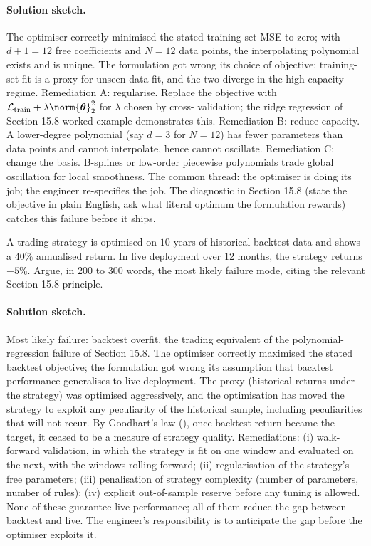 \paragraph{Solution sketch.}
The optimiser correctly minimised the stated training-set MSE to
zero; with $d + 1 = 12$ free coefficients and $N = 12$ data
points, the interpolating polynomial exists and is unique. The
formulation got wrong its choice of objective: training-set fit is
a proxy for unseen-data fit, and the two diverge in the
high-capacity regime. Remediation A: regularise. Replace the
objective with $\mathcal{L}_{\text{train}} + \lambda
\norm{\boldsymbol{\theta}}_{2}^{2}$ for $\lambda$ chosen by cross-
validation; the ridge regression of Section 15.8 worked example
demonstrates this. Remediation B: reduce capacity. A lower-degree
polynomial (say $d = 3$ for $N = 12$) has fewer parameters than
data points and cannot interpolate, hence cannot oscillate.
Remediation C: change the basis. B-splines or low-order piecewise
polynomials trade global oscillation for local smoothness. The
common thread: the optimiser is doing its job; the engineer
re-specifies the job. The diagnostic in Section 15.8 (state the
objective in plain English, ask what literal optimum the
formulation rewards) catches this failure before it ships.

\begin{exercise}
A trading strategy is optimised on $10$ years of historical
backtest data and shows a $40\%$ annualised return. In live
deployment over 12 months, the strategy returns $-5\%$. Argue,
in 200 to 300 words, the most likely failure mode, citing the
relevant Section 15.8 principle.
\end{exercise}

\paragraph{Solution sketch.}
Most likely failure: backtest overfit, the trading equivalent of
the polynomial-regression failure of Section 15.8. The optimiser
correctly maximised the stated backtest objective; the
formulation got wrong its assumption that backtest performance
generalises to live deployment. The proxy (historical returns
under the strategy) was optimised aggressively, and the
optimisation has moved the strategy to exploit any peculiarity of
the historical sample, including peculiarities that will not
recur. By Goodhart's law (\textcite{text:v2ch15-goodhart1975}), once
backtest return became the target, it ceased to be a measure of
strategy quality. Remediations: (i) walk-forward validation, in
which the strategy is fit on one window and evaluated on the next,
with the windows rolling forward; (ii) regularisation of the
strategy's free parameters; (iii) penalisation of strategy
complexity (number of parameters, number of rules); (iv) explicit
out-of-sample reserve before any tuning is allowed. None of these
guarantee live performance; all of them reduce the gap between
backtest and live. The engineer's responsibility is to anticipate
the gap before the optimiser exploits it.

